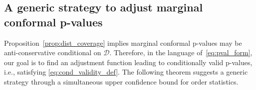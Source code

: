 \documentclass[11pt]{article}
\newcommand{\coverage}[1]{\textsc{Cvg}(#1)}
\def\marg{\textnormal{(marg)}}
\begin{document}
    


\subsection{A generic strategy to adjust marginal conformal p-values}

Proposition~\ref{prop:dist_coverage} implies marginal conformal p-values may be anti-conservative conditional on $\mathcal{D}$. Therefore, in the language of~\eqref{eq:pval_form}, our goal is to find an adjustment function leading to conditionally valid p-values, i.e.,  satisfying \eqref{eq:cond_validity_def}. The following theorem suggests a generic strategy through a simultaneous upper confidence bound for order statistics.
\end{document}
